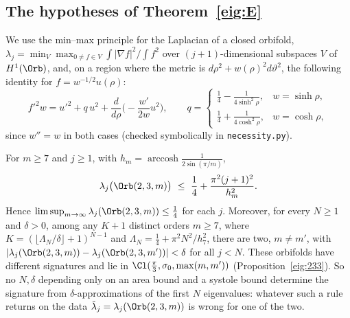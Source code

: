 
\subsection{The hypotheses of Theorem~\ref{eig:E}}\label{sec:eig-nec}

We use the min--max principle for the Laplacian of a closed orbifold, $\lambda_j=\min_V\max_{0\ne f\in V}\int|\nabla f|^2/\int f^2$ over $(j+1)$-dimensional subspaces $V$ of $H^1(\Orb)$, and, on a region where the metric is $d\rho^2+w(\rho)^2d\vartheta^2$, the following identity for $f=w^{-1/2}u(\rho)$:
\begin{equation}\label{eig:rayleigh}
  f'^2w=u'^2+q\,u^2+\frac d{d\rho}\Big(-\frac{w'}{2w}u^2\Big),\qquad
  q=\begin{cases}\frac14-\frac1{4\sinh^2\rho}, & w=\sinh\rho,\\ \frac14+\frac1{4\cosh^2\rho}, & w=\cosh\rho,\end{cases}
\end{equation}
since $w''=w$ in both cases (checked symbolically in \texttt{necessity.py}).

\begin{proposition}\label{eig:N1}
For $m\ge7$ and $j\ge1$, with $h_m=\operatorname{arccosh}\frac1{2\sin(\pi/m)}$,
\[
  \lambda_j\big(\Orb(2,3,m)\big)\ \le\ \frac14+\frac{\pi^2(j+1)^2}{h_m^2}.
\]
Hence $\limsup_{m\to\infty}\lambda_j(\Orb(2,3,m))\le\frac14$ for each $j$. Moreover, for every $N\ge1$ and $\delta>0$, among any $K+1$ distinct orders $m\ge7$, where $K=(\lfloor\Lambda_N/\delta\rfloor+1)^{N-1}$ and $\Lambda_N=\frac14+\pi^2N^2/h_7^2$, there are two, $m\ne m'$, with $|\lambda_j(\Orb(2,3,m))-\lambda_j(\Orb(2,3,m'))|<\delta$ for all $j<N$. These orbifolds have different signatures and lie in $\Cl(\frac\pi3,\sigma_0,\max(m,m'))$ (Proposition~\ref{eig:233}). So no $N,\delta$ depending only on an area bound and a systole bound determine the signature from $\delta$-approximations of the first $N$ eigenvalues: whatever such a rule returns on the data $\tilde\lambda_j=\lambda_j(\Orb(2,3,m))$ is wrong for one of the two.
\end{proposition}

